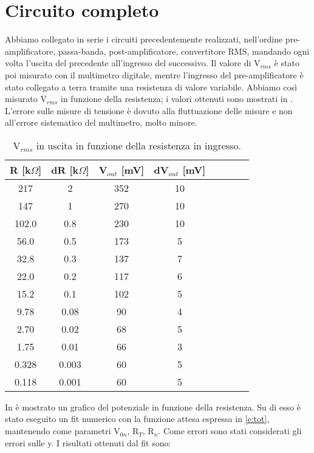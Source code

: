 \section{Circuito completo}
Abbiamo collegato in serie i circuiti precedentemente realizzati, nell'ordine pre-amplificatore, passa-banda, post-amplificatore, convertitore RMS, mandando ogni volta l'uscita del precedente all'ingresso del successivo. Il valore di V$_{rms}$ è stato poi misurato con il multimetro digitale, mentre l'ingresso del pre-amplificatore è stato collegato a terra tramite una resistenza di valore variabile. Abbiamo così misurato V$_{rms}$ in funzione della resistenza; i valori ottenuti sono mostrati in . L'errore sulle misure di tensione è dovuto alla fluttuazione delle misure e non all'errore sistematico del multimetro, molto minore.\\
\begin{table}[h]
	\centering
	\begin{tabular}{cccccccc}		
		 {R [k$\Omega$]}& {dR [k$\Omega$]}& {V$_{out}$ [mV]} & {dV$_{out}$ [mV]}\\
		 \midrule
                       217 & 2 & 352 & 10\\
                       147 & 1 & 270 & 10\\
                       102.0 & 0.8 & 230 & 10\\ 
                       56.0 & 0.5 & 173 & 5\\
                       32.8 & 0.3 & 137 & 7\\
                       22.0 & 0.2 & 117 & 6\\
                       15.2 & 0.1 & 102 & 5\\
                       9.78 & 0.08 & 90 & 4\\ 
                       2.70 & 0.02 & 68 & 5\\
                       1.75 & 0.01 & 66 & 3\\
                       0.328 & 0.003 & 60 & 5\\
                       0.118 & 0.001 & 60 & 5\\
 	\end{tabular}
	\caption{V$_{rms}$ in uscita in funzione della resistenza in ingresso.}
	\label{t:resistenze}
\end{table}
In  è mostrato un grafico del potenziale in funzione della resistenza. Su di esso è stato eseguito un fit numerico con la funzione attesa espressa in \ref{e:tot}, mantenendo come parametri V$_{0n}$, R$_T$, R$_n$. Come errori sono stati considerati gli errori sulle y. I risultati ottenuti dal fit sono:
